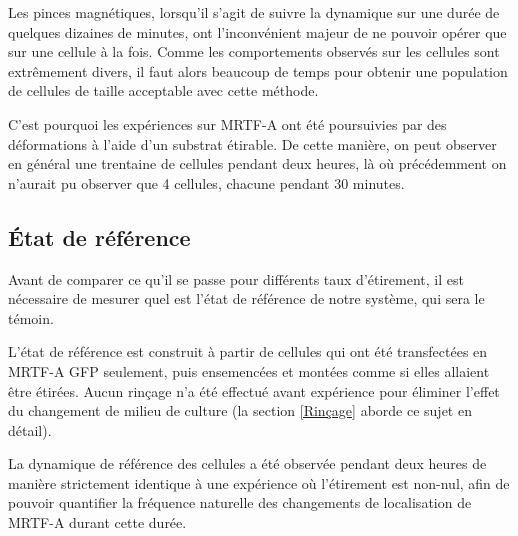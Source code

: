 Les pinces magnétiques, lorsqu'il s'agit de suivre la dynamique sur une durée de quelques dizaines de minutes, ont l'inconvénient majeur de ne pouvoir opérer que sur une cellule à la fois. Comme les comportements observés sur les cellules sont extrêmement divers, il faut alors beaucoup de temps pour obtenir une population de cellules de taille acceptable avec cette méthode. 

C'est pourquoi les expériences sur MRTF-A ont été poursuivies par des déformations à l'aide d'un substrat étirable. De cette manière, on peut observer en général une trentaine de cellules pendant deux heures, là où précédemment on n'aurait pu observer que 4 cellules, chacune pendant 30 minutes. 



\subsection{\'Etat de référence}

Avant de comparer ce qu'il se passe pour différents taux d'étirement, il est nécessaire de mesurer quel est l'état de référence de notre système, qui sera le témoin. 

L'état de référence est construit à partir de cellules qui ont été transfectées en MRTF-A GFP seulement, puis ensemencées et montées comme si elles allaient être étirées. 
Aucun rinçage n'a été effectué avant expérience pour éliminer l'effet du changement de milieu de culture (la section \ref{Rinçage} aborde ce sujet en détail). 

La dynamique de référence des cellules a été observée pendant deux heures de manière strictement identique à une expérience où l'étirement est non-nul, afin de pouvoir quantifier la fréquence naturelle des changements de localisation de MRTF-A durant cette durée. 

